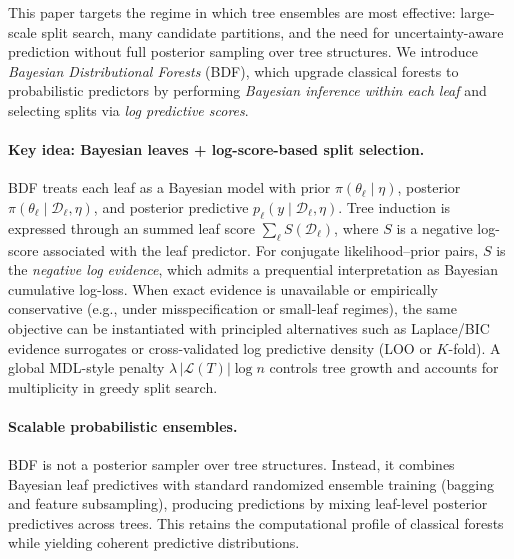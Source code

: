 \documentclass[twoside,11pt]{article}
\begin{document}
This paper targets the regime in which tree ensembles are most effective: large-scale split search, many candidate partitions, and the need for uncertainty-aware prediction without full posterior sampling over tree structures.
We introduce \emph{Bayesian Distributional Forests} (BDF), which upgrade classical forests to probabilistic predictors by performing \emph{Bayesian inference within each leaf} and selecting splits via \emph{log predictive scores}.

\paragraph{Key idea: Bayesian leaves + log-score-based split selection.}
BDF treats each leaf as a Bayesian model with prior $\pi(\theta_\ell\mid\eta)$, posterior $\pi(\theta_\ell\mid\mathcal{D}_\ell,\eta)$, and posterior predictive $p_\ell(y\mid \mathcal{D}_\ell,\eta)$.
Tree induction is expressed through an summed leaf score $\sum_{\ell} S(\mathcal{D}_\ell)$, where $S$ is a negative log-score associated with the leaf predictor.
For conjugate likelihood--prior pairs, $S$ is the \emph{negative log evidence}, which admits a prequential interpretation as Bayesian cumulative log-loss.
When exact evidence is unavailable or empirically conservative (e.g., under misspecification or small-leaf regimes), the same objective can be instantiated with principled alternatives such as Laplace/BIC evidence surrogates or cross-validated log predictive density (LOO or $K$-fold).
A global MDL-style penalty $\lambda\,|\mathcal{L}(T)|\log n$ controls tree growth and accounts for multiplicity in greedy split search.

\paragraph{Scalable probabilistic ensembles.}
BDF is not a posterior sampler over tree structures.
Instead, it combines Bayesian leaf predictives with standard randomized ensemble training (bagging and feature subsampling), producing predictions by mixing leaf-level posterior predictives across trees.
This retains the computational profile of classical forests while yielding coherent predictive distributions.
\end{document}
